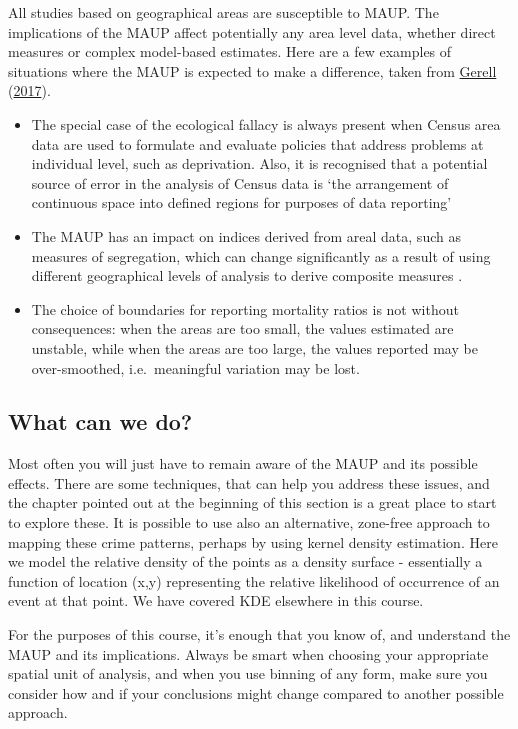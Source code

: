 \documentclass[
]{book}
\providecommand{\tightlist}{%
  \setlength{\itemsep}{0pt}\setlength{\parskip}{0pt}}
\begin{document}
All studies based on geographical areas are susceptible to MAUP. The implications of the MAUP affect potentially any area level data, whether direct measures or complex model-based estimates. Here are a few examples of situations where the MAUP is expected to make a difference, taken from \protect\hyperlink{ref-Gerell_2017}{Gerell} (\protect\hyperlink{ref-Gerell_2017}{2017}).

\begin{itemize}
\tightlist
\item
  The special case of the ecological fallacy is always present when Census area data are used to formulate and evaluate policies that address problems at individual level, such as deprivation. Also, it is recognised that a potential source of error in the analysis of Census data is `the arrangement of continuous space into defined regions for purposes of data reporting'
\item
  The MAUP has an impact on indices derived from areal data, such as measures of segregation, which can change significantly as a result of using different geographical levels of analysis to derive composite measures .
\item
  The choice of boundaries for reporting mortality ratios is not without consequences: when the areas are too small, the values estimated are unstable, while when the areas are too large, the values reported may be over-smoothed, i.e.~meaningful variation may be lost.
\end{itemize}

\hypertarget{what-can-we-do}{%
\subsection{What can we do?}\label{what-can-we-do}}

Most often you will just have to remain aware of the MAUP and its possible effects. There are some techniques, that can help you address these issues, and the chapter pointed out at the beginning of this section is a great place to start to explore these. It is possible to use also an alternative, zone-free approach to mapping these crime patterns, perhaps by using kernel density estimation. Here we model the relative density of the points as a density surface - essentially a function of location (x,y) representing the relative likelihood of occurrence of an event at that point. We have covered KDE elsewhere in this course.

For the purposes of this course, it's enough that you know of, and understand the MAUP and its implications. Always be smart when choosing your appropriate spatial unit of analysis, and when you use binning of any form, make sure you consider how and if your conclusions might change compared to another possible approach.
\end{document}
